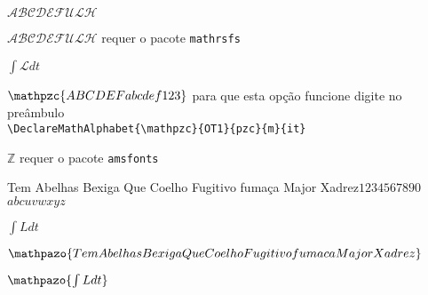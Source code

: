 \documentclass{article}
\newcommand{\frase}{Tem Abelhas Bexiga Que Coelho Fugitivo fumaça Major Xadrez}
\begin{document}
$\mathcal{ABCDEFULH}$

$\mathscr{ABCDEFULH}$ requer o pacote \verb|mathrsfs|

$\int \mathscr{L} dt$

$\mathpzc{ABCDEFabcdef123}$ para que esta opção funcione digite no preâmbulo\\
\verb|\DeclareMathAlphabet{\mathpzc}{OT1}{pzc}{m}{it}|

$\mathbb{Z}$ requer o pacote \verb|amsfonts|

\frase $1234567890$ $abcuvwxyz$

$\int L dt$

$\mathpazo{Tem Abelhas Bexiga Que Coelho Fugitivo fumaca Major Xadrez}$

$\mathpazo{\int L dt}$
\end{document}
